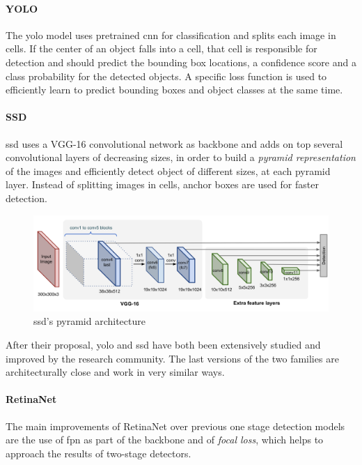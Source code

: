 \documentclass[%
    corpo=12pt,
    twoside,
    stile=classica,   
    tipotesi=magistrale,
    evenboxes,
    english,
	numerazioneromana,
]{toptesi}
\begin{document}
\paragraph{YOLO}\label{sec:yolo}
The \gls{yolo} model\cite{redmon2016look} uses pretrained \gls{cnn} for classification and splits each image in cells. If the center of an object falls into a cell, that cell is responsible for detection and should predict the bounding box locations, a confidence score and a class probability for the detected objects. A specific loss function is used to efficiently learn to predict bounding boxes and object classes at the same time.

\paragraph{SSD}
\gls{ssd}\cite{Liu_2016} uses a VGG-16 convolutional network as backbone and adds on top several convolutional layers of decreasing sizes, in order to build a \textit{pyramid representation} of the images and efficiently detect object of different sizes, at each pyramid layer. Instead of splitting images in cells, anchor boxes are used for faster detection.

\begin{figure}[ht]
	\centering
	\includegraphics[width=.9\linewidth]{imgs/SSD-architecture.png}
	\caption{\acrshort{ssd}'s pyramid architecture\cite{objdetpart4}}
	\label{fig:ssd}
\end{figure}

After their proposal, \gls{yolo} and \gls{ssd} have both been extensively studied and improved by the research community. The last versions of the two families are architecturally close and work in very similar ways.

\paragraph{RetinaNet}
The main improvements of RetinaNet\cite{lin2018focal} over previous one stage detection models are the use of \gls{fpn} as part of the backbone and of \textit{focal loss}, which helps to approach the results of two-stage detectors.
\end{document}
